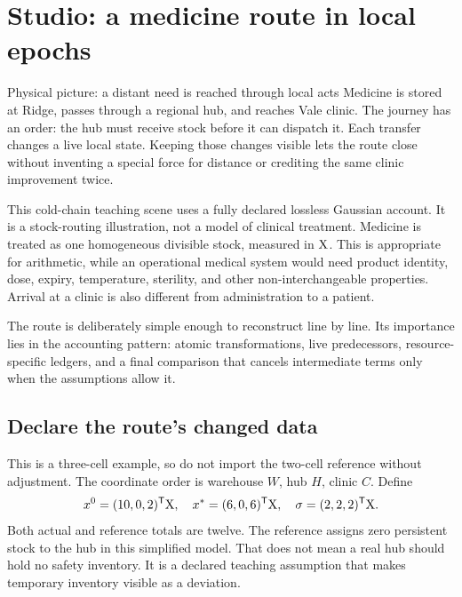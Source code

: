 \chapter{Studio: a medicine route in local epochs}\label{ch:studio-route}

\begin{intuitionbox}{Physical picture: a distant need is reached through local acts}
Medicine is stored at Ridge, passes through a regional hub, and reaches Vale clinic. The journey has an order: the hub must receive stock before it can dispatch it. Each transfer changes a live local state. Keeping those changes visible lets the route close without inventing a special force for distance or crediting the same clinic improvement twice.
\end{intuitionbox}

This cold-chain teaching scene uses a fully declared lossless Gaussian account. It is a stock-routing illustration, not a model of clinical treatment. Medicine is treated as one homogeneous divisible stock, measured in \(\mathrm{X}\). This is appropriate for arithmetic, while an operational medical system would need product identity, dose, expiry, temperature, sterility, and other non-interchangeable properties. Arrival at a clinic is also different from administration to a patient.

The route is deliberately simple enough to reconstruct line by line. Its importance lies in the accounting pattern: atomic transformations, live predecessors, resource-specific ledgers, and a final comparison that cancels intermediate terms only when the assumptions allow it.

\section{Declare the route's changed data}

This is a three-cell example, so do not import the two-cell reference without adjustment. The coordinate order is warehouse \(W\), hub \(H\), clinic \(C\). Define
\begin{equation}
x^0=(10,0,2)^{\mathsf T}\mathrm{X},
\quad x^*=(6,0,6)^{\mathsf T}\mathrm{X},
\quad \sigma=(2,2,2)^{\mathsf T}\mathrm{X}.
\end{equation}
Both actual and reference totals are twelve. The reference assigns zero persistent stock to the hub in this simplified model. That does not mean a real hub should hold no safety inventory. It is a declared teaching assumption that makes temporary inventory visible as a deviation.

